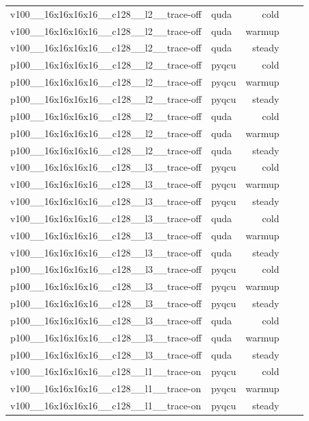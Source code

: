 \begin{table}[htbp]
\begin{tabular}{@{}llrrr@{}}
v100\_\_16x16x16x16\_\_c128\_\_l2\_\_trace-off & quda & cold &  &  \\
v100\_\_16x16x16x16\_\_c128\_\_l2\_\_trace-off & quda & warmup &  &  \\
v100\_\_16x16x16x16\_\_c128\_\_l2\_\_trace-off & quda & steady &  &  \\
p100\_\_16x16x16x16\_\_c128\_\_l2\_\_trace-off & pyqcu & cold &  &  \\
p100\_\_16x16x16x16\_\_c128\_\_l2\_\_trace-off & pyqcu & warmup &  &  \\
p100\_\_16x16x16x16\_\_c128\_\_l2\_\_trace-off & pyqcu & steady &  &  \\
p100\_\_16x16x16x16\_\_c128\_\_l2\_\_trace-off & quda & cold &  &  \\
p100\_\_16x16x16x16\_\_c128\_\_l2\_\_trace-off & quda & warmup &  &  \\
p100\_\_16x16x16x16\_\_c128\_\_l2\_\_trace-off & quda & steady &  &  \\
v100\_\_16x16x16x16\_\_c128\_\_l3\_\_trace-off & pyqcu & cold &  &  \\
v100\_\_16x16x16x16\_\_c128\_\_l3\_\_trace-off & pyqcu & warmup &  &  \\
v100\_\_16x16x16x16\_\_c128\_\_l3\_\_trace-off & pyqcu & steady &  &  \\
v100\_\_16x16x16x16\_\_c128\_\_l3\_\_trace-off & quda & cold &  &  \\
v100\_\_16x16x16x16\_\_c128\_\_l3\_\_trace-off & quda & warmup &  &  \\
v100\_\_16x16x16x16\_\_c128\_\_l3\_\_trace-off & quda & steady &  &  \\
p100\_\_16x16x16x16\_\_c128\_\_l3\_\_trace-off & pyqcu & cold &  &  \\
p100\_\_16x16x16x16\_\_c128\_\_l3\_\_trace-off & pyqcu & warmup &  &  \\
p100\_\_16x16x16x16\_\_c128\_\_l3\_\_trace-off & pyqcu & steady &  &  \\
p100\_\_16x16x16x16\_\_c128\_\_l3\_\_trace-off & quda & cold &  &  \\
p100\_\_16x16x16x16\_\_c128\_\_l3\_\_trace-off & quda & warmup &  &  \\
p100\_\_16x16x16x16\_\_c128\_\_l3\_\_trace-off & quda & steady &  &  \\
v100\_\_16x16x16x16\_\_c128\_\_l1\_\_trace-on & pyqcu & cold &  &  \\
v100\_\_16x16x16x16\_\_c128\_\_l1\_\_trace-on & pyqcu & warmup &  &  \\
v100\_\_16x16x16x16\_\_c128\_\_l1\_\_trace-on & pyqcu & steady &  &  \\

\end{tabular}
\end{table}
